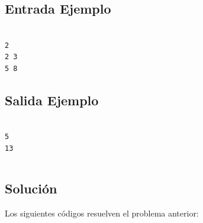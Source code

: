 \begin{multicols}{2}

\subsection*{Entrada Ejemplo}

\begin{verbatim}

2
2 3
5 8

\end{verbatim}

\subsection*{Salida Ejemplo}

\begin{verbatim}

5
13

\end{verbatim}

\end{multicols}
\newpage

$$$$
$$$$
$$$$

\subsection*{Solución}

Los siguientes códigos resuelven el problema anterior:

